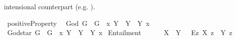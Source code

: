 \begin{isabellebody}
\begin{isamarkuptext}
intensional counterpart (e.g. ).%
\end{isamarkuptext}\isamarkuptrue%
\isamarkupfalse%
\ positiveProperty{\isacharcolon}{\isacharcolon}{\isachardoublequoteopen}{\isasymup}{\isasymlangle}{\isasymlangle}{\isasymzero}{\isasymrangle}{\isasymrangle}{\isachardoublequoteclose}\ {\isacharparenleft}{\isachardoublequoteopen}{\isasymP}{\isachardoublequoteclose}{\isacharparenright}\isanewline
{}\isamarkupfalse%
\ God{\isacharcolon}{\isacharcolon}{\isachardoublequoteopen}{\isasymup}{\isasymlangle}{\isasymzero}{\isasymrangle}{\isachardoublequoteclose}\ {\isacharparenleft}{\isachardoublequoteopen}G{\isachardoublequoteclose}{\isacharparenright}\ \ {\isachardoublequoteopen}G\ {\isasymequiv}\ {\isacharparenleft}{\isasymlambda}x{\isachardot}\ \isactrlbold {\isasymforall}Y{\isachardot}\ {\isasymP}\ Y\ \isactrlbold {\isasymrightarrow}\ {\isasymlparr}Y\ x{\isasymrparr}{\isacharparenright}{\isachardoublequoteclose}\isanewline
{}\isamarkupfalse%
\ God{\isacharunderscore}star{\isacharcolon}{\isacharcolon}{\isachardoublequoteopen}{\isasymup}{\isasymlangle}{\isasymzero}{\isasymrangle}{\isachardoublequoteclose}\ {\isacharparenleft}{\isachardoublequoteopen}G{\isacharasterisk}{\isachardoublequoteclose}{\isacharparenright}\ \ {\isachardoublequoteopen}G{\isacharasterisk}\ {\isasymequiv}\ {\isacharparenleft}{\isasymlambda}x{\isachardot}\ \isactrlbold {\isasymforall}Y{\isachardot}\ {\isasymP}\ Y\ \isactrlbold {\isasymleftrightarrow}\ {\isasymlparr}Y\ x{\isasymrparr}{\isacharparenright}{\isachardoublequoteclose}\isanewline
\isanewline
{}\isamarkupfalse%
\ Entailment{\isacharcolon}{\isacharcolon}{\isachardoublequoteopen}{\isasymup}{\isasymlangle}{\isasymlangle}{\isasymzero}{\isasymrangle}{\isacharcomma}{\isasymlangle}{\isasymzero}{\isasymrangle}{\isasymrangle}{\isachardoublequoteclose}\ {\isacharparenleft}\ {\isachardoublequoteopen}{\isasymRrightarrow}{\isachardoublequoteclose}\ {}{}{\isacharparenright}\ \isanewline
\ \ {\isachardoublequoteopen}X\ {\isasymRrightarrow}\ Y\ {\isasymequiv}\ \ \isactrlbold {\isasymbox}{\isacharparenleft}\isactrlbold {\isasymforall}\isactrlsup Ez{\isachardot}\ {\isasymlparr}X\ z{\isasymrparr}\ \isactrlbold {\isasymrightarrow}\ {\isasymlparr}Y\ z{\isasymrparr}{\isacharparenright}{\isachardoublequoteclose}%
\end{isabellebody}
